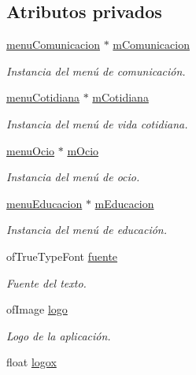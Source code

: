 \subsection*{Atributos privados}
\begin{DoxyCompactItemize}
\item 
\hyperlink{classmenu_comunicacion}{menu\+Comunicacion} $\ast$ \hyperlink{classmenu_principal_af820d04d0e35fa1f4c552af95d5e3036}{m\+Comunicacion}
\begin{DoxyCompactList}\small\item\em Instancia del menú de comunicación. \end{DoxyCompactList}\item 
\hyperlink{classmenu_cotidiana}{menu\+Cotidiana} $\ast$ \hyperlink{classmenu_principal_a67ce856e4bf6566b0e2dc4f6c1471e19}{m\+Cotidiana}
\begin{DoxyCompactList}\small\item\em Instancia del menú de vida cotidiana. \end{DoxyCompactList}\item 
\hyperlink{classmenu_ocio}{menu\+Ocio} $\ast$ \hyperlink{classmenu_principal_a8e372431b14d13de965f84dc0593e08a}{m\+Ocio}
\begin{DoxyCompactList}\small\item\em Instancia del menú de ocio. \end{DoxyCompactList}\item 
\hyperlink{classmenu_educacion}{menu\+Educacion} $\ast$ \hyperlink{classmenu_principal_a495c578e5fba7f2453f963e88c193b5d}{m\+Educacion}
\begin{DoxyCompactList}\small\item\em Instancia del menú de educación. \end{DoxyCompactList}\item 
of\+True\+Type\+Font \hyperlink{classmenu_principal_a23f1de2b0d66522eae4ce63763d31ce6}{fuente}
\begin{DoxyCompactList}\small\item\em Fuente del texto. \end{DoxyCompactList}\item 
of\+Image \hyperlink{classmenu_principal_aa5ec7fdf5031285aab08c58e0fecbd82}{logo}
\begin{DoxyCompactList}\small\item\em Logo de la aplicación. \end{DoxyCompactList}\item 
float \hyperlink{classmenu_principal_aca0ebae92aafb9026c9aace3e23463fb}{logox}

\end{DoxyCompactItemize}
